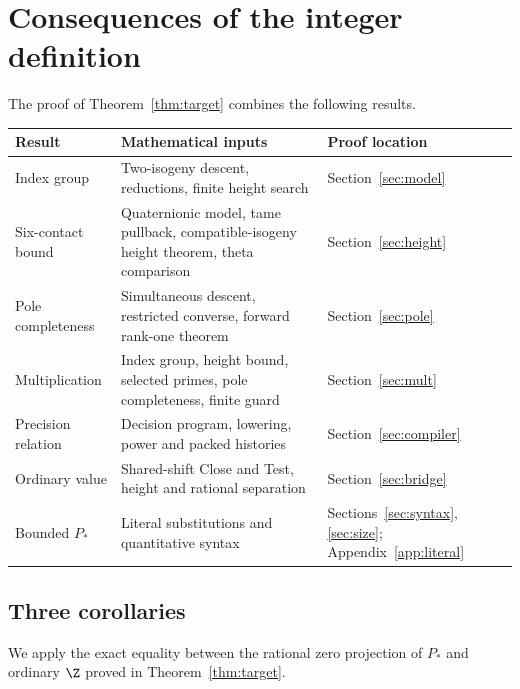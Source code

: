 \section{Consequences of the integer definition}
The proof of Theorem~\ref{thm:target} combines the following results.
\begin{center}\small
\begin{tabular}{p{}p{}p{}}
\toprule
Result & Mathematical inputs & Proof location\\\midrule
Index group & Two-isogeny descent, reductions, finite height search &
Section~\ref{sec:model}\\
Six-contact bound & Quaternionic model, tame pullback, compatible-isogeny
height theorem, theta comparison & Section~\ref{sec:height}\\
Pole completeness & Simultaneous descent, restricted converse, forward
rank-one theorem & Section~\ref{sec:pole}\\
Multiplication & Index group, height bound, selected primes,
pole completeness, finite guard & Section~\ref{sec:mult}\\
Precision relation & Decision program, lowering, power and packed histories &
Section~\ref{sec:compiler}\\
Ordinary value & Shared-shift Close and Test, height and rational separation &
Section~\ref{sec:bridge}\\
Bounded $P_*$ & Literal substitutions and quantitative syntax &
Sections~\ref{sec:syntax}, \ref{sec:size}; Appendix~\ref{app:literal}\\\bottomrule
\end{tabular}
\end{center}

\subsection{Three corollaries}\label{sec:four-corollaries}
We apply the exact equality between the rational zero projection of
$P_*$ and ordinary $\Z$ proved in Theorem~\ref{thm:target}.

